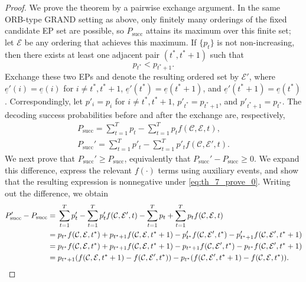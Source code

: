 \documentclass[letterpaper,draftclsnofoot,onecolumn]{IEEEtran}
\begin{document}
\begin{proof}
We prove the theorem by a pairwise exchange argument. In the same ORB-type GRAND setting as above, only finitely many orderings of the fixed candidate EP set are possible, so $P_{\mathrm{succ}}$ attains its maximum over this finite set; let $\mathcal{E}$ be any ordering that achieves this maximum. If $\{p_t\}$ is not non-increasing, then there exists at least one adjacent pair $(t^{*}, t^{*}+1)$ such that
\begin{equation}\label{eq:th_7_prove_0}
    p_{t^{*}} < p_{t^{*}+1}.
\end{equation}
Exchange these two EPs and denote the resulting ordered set by $\mathcal{E}'$, where $\underline{e}'(i)=\underline{e}(i)$ for $i\neq t^{*},t^{*}+1$, $\underline{e}'(t^{*})=\underline{e}(t^{*}+1)$, and $\underline{e}'(t^{*}+1)=\underline{e}(t^{*})$. Correspondingly, let $p'_i=p_i$ for $i\neq t^{*},t^{*}+1$, $p'_{t^{*}}=p_{t^{*}+1}$, and $p'_{t^{*}+1}=p_{t^{*}}$. The decoding success probabilities before and after the exchange are, respectively,
    \begin{gather}
    P_{\mathrm{succ}}=\sum_{t=1}^{T}p_t-\sum_{t=1}^{T}p_tf(\mathcal{C},\mathcal{E},t),\\
    P_{\mathrm{succ}}'=\sum_{t=1}^{T}p'_t-\sum_{t=1}^{T}p'_tf(\mathcal{C},\mathcal{E}',t).
\end{gather}
We next prove that $P_{\mathrm{succ}}'\ge P_{\mathrm{succ}}$, equivalently that $P_{\mathrm{succ}}'-P_{\mathrm{succ}}\ge 0$. We expand this difference, express the relevant $f(\cdot)$ terms using auxiliary events, and show that the resulting expression is nonnegative under \eqref{eq:th_7_prove_0}. Writing out the difference, we obtain
\begin{align}
    P_{\mathrm{succ}}' - P_{\mathrm{succ}} ={}& \sum_{t=1}^{T}p'_t - \sum_{t=1}^{T}p'_t f(\mathcal{C},\mathcal{E}',t) - \sum_{t=1}^{T}p_t + \sum_{t=1}^{T}p_tf(\mathcal{C},\mathcal{E},t) \notag \\
    ={}& p_{t^{*}}f(\mathcal{C},\mathcal{E},t^{*}) + p_{t^{*}+1}f(\mathcal{C},\mathcal{E},t^{*}+1) - p'_{t^{*}}f(\mathcal{C},\mathcal{E}',t^{*}) - p'_{t^{*}+1}f(\mathcal{C},\mathcal{E}',t^{*}+1) \label{eq:th_7_prove_1}\\
    ={}& p_{t^{*}}f(\mathcal{C},\mathcal{E},t^{*}) + p_{t^{*}+1}f(\mathcal{C},\mathcal{E},t^{*}+1) - p_{t^{*}+1}f(\mathcal{C},\mathcal{E}',t^{*}) - p_{t^{*}}f(\mathcal{C},\mathcal{E}',t^{*}+1) \notag \\
    ={}& p_{t^{*}+1}(f(\mathcal{C},\mathcal{E},t^{*}+1) - f(\mathcal{C},\mathcal{E}',t^{*})) - p_{t^{*}}(f(\mathcal{C},\mathcal{E}',t^{*}+1) - f(\mathcal{C},\mathcal{E},t^{*})). \label{eq:th_7_prove_2}
\end{align}


\end{proof}
\end{document}

